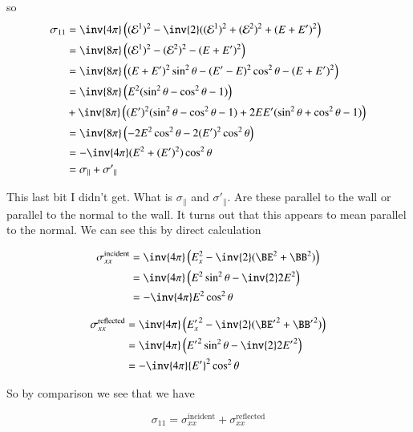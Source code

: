 so
\begin{align*}
\sigma_{1 1} 
&= \inv{4 \pi} \left( (\mathcal{E}^1)^2 - \inv{2} ((\mathcal{E}^1)^2 + (\mathcal{E}^2)^2 + (E + E')^2 \right) \\
&= \inv{8 \pi} \left( (\mathcal{E}^1)^2 - (\mathcal{E}^2)^2 - (E + E')^2 \right) \\
&= \inv{8 \pi} \left( 
(E + E')^2 \sin^2\theta 
-(E' - E)^2 \cos^2\theta -(E + E')^2
\right) \\
&= 
\inv{8 \pi} \left( 
E^2( \sin^2\theta - \cos^2\theta - 1)
\right) \\
&+\inv{8 \pi} \left( 
(E')^2( \sin^2\theta - \cos^2\theta - 1)
+ 2 E E' (\sin^2\theta + \cos^2\theta -1 )
\right) \\
&= \inv{8 \pi} \left( - 2 E^2 \cos^2\theta - 2 (E')^2 \cos^2\theta \right) \\
&= -\inv{4 \pi} (E^2 + (E')^2) \cos^2\theta \\
&= \sigma_\parallel + {\sigma'}_\parallel
\end{align*}

This last bit I didn't get.  What is $\sigma_\parallel$ and ${\sigma'}_\parallel$.  Are these parallel to the wall or parallel to the normal to the wall.  It turns out that this appears to mean parallel to the normal.  We can see this by direct calculation

\begin{align*}
\sigma_{x x}^{\text{incident}} 
&= \inv{4 \pi} \left( 
E_x^2 - \inv{2} (\BE^2 + \BB^2)
\right) \\
&= \inv{4 \pi} \left( 
E^2 \sin^2 \theta - \inv{2} 2 E^2 
\right) \\
&= -\inv{4 \pi} E^2 \cos^2\theta
\end{align*}

\begin{align*}
{\sigma}_{x x}^{\text{reflected}} 
&= \inv{4 \pi} \left( 
{E_x'}^2 - \inv{2} ({\BE'}^2 + {\BB'}^2)
\right) \\
&= \inv{4 \pi} \left( 
{E'}^2 \sin^2 \theta - \inv{2} 2 {E'}^2 
\right) \\
&= -\inv{4 \pi} {E'}^2 \cos^2\theta
\end{align*}

So by comparison we see that we have

\begin{equation}\label{eqn:relativisticElectrodynamicsT9:620}
\sigma_{1 1} = {\sigma}_{x x}^{\text{incident}} +{\sigma}_{x x}^{\text{reflected}} 
\end{equation}

